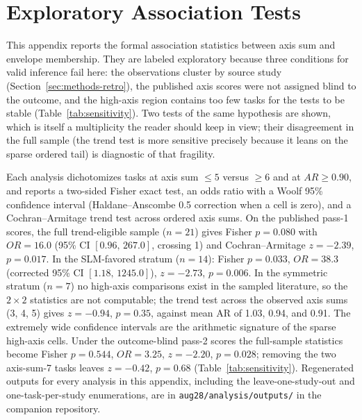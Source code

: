 \documentclass[11pt]{article}
\begin{document}
\appendix

\section{Exploratory Association Tests}
\label{app:tests}

This appendix reports the formal association statistics between axis sum and envelope membership. They are labeled exploratory because three conditions for valid inference fail here: the observations cluster by source study (Section~\ref{sec:methods-retro}), the published axis scores were not assigned blind to the outcome, and the high-axis region contains too few tasks for the tests to be stable (Table~\ref{tab:sensitivity}). Two tests of the same hypothesis are shown, which is itself a multiplicity the reader should keep in view; their disagreement in the full sample (the trend test is more sensitive precisely because it leans on the sparse ordered tail) is diagnostic of that fragility.

Each analysis dichotomizes tasks at axis sum $\leq 5$ versus $\geq 6$ and at $AR \geq 0.90$, and reports a two-sided Fisher exact test, an odds ratio with a Woolf 95\% confidence interval (Haldane--Anscombe 0.5 correction when a cell is zero), and a Cochran--Armitage trend test across ordered axis sums. On the published pass-1 scores, the full trend-eligible sample ($n = 21$) gives Fisher $p = 0.080$ with $OR = 16.0$ (95\% CI $[0.96,\,267.0]$, crossing 1) and Cochran--Armitage $z = -2.39$, $p = 0.017$. In the SLM-favored stratum ($n = 14$): Fisher $p = 0.033$, $OR = 38.3$ (corrected 95\% CI $[1.18,\,1245.0]$), $z = -2.73$, $p = 0.006$. In the symmetric stratum ($n = 7$) no high-axis comparisons exist in the sampled literature, so the $2{\times}2$ statistics are not computable; the trend test across the observed axis sums (3, 4, 5) gives $z = -0.94$, $p = 0.35$, against mean AR of 1.03, 0.94, and 0.91. The extremely wide confidence intervals are the arithmetic signature of the sparse high-axis cells. Under the outcome-blind pass-2 scores the full-sample statistics become Fisher $p = 0.544$, $OR = 3.25$, $z = -2.20$, $p = 0.028$; removing the two axis-sum-7 tasks leaves $z = -0.42$, $p = 0.68$ (Table~\ref{tab:sensitivity}). Regenerated outputs for every analysis in this appendix, including the leave-one-study-out and one-task-per-study enumerations, are in \texttt{aug28/analysis/outputs/} in the companion repository.



\end{document}

